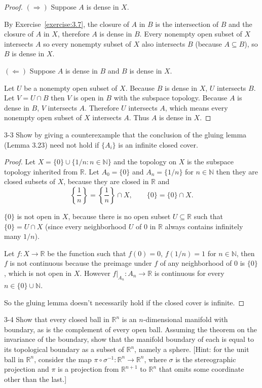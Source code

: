 \begin{proof}
	$(\Longrightarrow)$ Suppose $A$ is dense in $X$.

	By Exercise~\ref{exercise:3.7}, the closure of $A$ in $B$ is the intersection of $B$ and the closure of $A$ in $X$, therefore $A$ is dense in $B$. Every nonempty open subset of $X$ intersects $A$ so every nonempty subset of $X$ also intersects $B$ (because $A\subseteq B$), so $B$ is dense in $X$.

	$(\Longleftarrow)$ Suppose $A$ is dense in $B$ and $B$ is dense in $X$.

	Let $U$ be a nonempty open subset of $X$. Because $B$ is dense in $X$, $U$ intersects $B$. Let $V = U\cap B$ then $V$ is open in $B$ with the subspace topology. Because $A$ is dense in $B$, $V$ intersects $A$. Therefore $U$ intersects $A$, which means every nonempty open subset of $X$ intersects $A$. Thus $A$ is dense in $X$.
\end{proof}

\begin{problem}{3-3}
Show by giving a counterexample that the conclusion of the gluing lemma (Lemma 3.23) need not hold if $\{ A_{i} \}$ is an infinite closed cover.
\end{problem}

\begin{proof}
	Let $X = \{ 0 \} \cup \{ 1/n : n\in\mathbb{N} \}$ and the topology on $X$ is the subspace topology inherited from $\mathbb{R}$. Let $A_{0} = \{ 0 \}$ and $A_{n} = \{ 1/n \}$ for $n\in\mathbb{N}$ then they are closed subsets of $X$, because they are closed in $\mathbb{R}$ and
	\[
		\left\{ \frac{1}{n} \right\} = \left\{\frac{1}{n}\right\} \cap X,\qquad \{ 0 \} = \{ 0 \} \cap X.
	\]

	$\{ 0 \}$ is not open in $X$, because there is no open subset $U\subseteq\mathbb{R}$ such that $\{ 0 \} = U\cap X$ (since every neighborhood $U$ of $0$ in $\mathbb{R}$ always contains infinitely many $1/n$).

	Let $f: X\to \mathbb{R}$ be the function such that $f(0) = 0$, $f(1/n) = 1$ for $n\in\mathbb{N}$, then $f$ is not continuous because the preimage under $f$ of any neighborhood of $0$ is $\{ 0 \}$, which is not open in $X$. However $f\vert_{A_{n}}: A_{n}\to \mathbb{R}$ is continuous for every $n\in \{ 0 \}\cup\mathbb{N}$.

	So the gluing lemma doesn't necessarily hold if the closed cover is infinite.
\end{proof}

\begin{problem}{3-4}
Show that every closed ball in $\mathbb{R}^{n}$ is an $n$-dimensional manifold with boundary, as is the complement of every open ball. Assuming the theorem on the invariance of the boundary, show that the manifold boundary of each is equal to its topological boundary as a subset of $\mathbb{R}^{n}$, namely a sphere. [Hint: for the unit ball in $\mathbb{R}^{n}$, consider the map $\pi\circ\sigma^{-1}: \mathbb{R}^{n}\to\mathbb{R}^{n}$, where $\sigma$ is the stereographic projection and $\pi$ is a projection from $\mathbb{R}^{n+1}$ to $\mathbb{R}^{n}$ that omits some coordinate other than the last.]
\end{problem}

